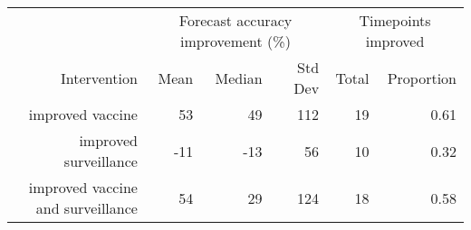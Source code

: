 
\begin{tabular*}{1.0\textwidth}{rrrrrr}
\toprule
             & \multicolumn{3}{c}{Forecast accuracy improvement (\%)} & \multicolumn{2}{c}{Timepoints improved} \\
Intervention & Mean & Median & Std Dev & Total & Proportion \\
\midrule

improved vaccine & 53 & 49 & 112 & 19 & 0.61 \\
improved surveillance & -11 & -13 & 56 & 10 & 0.32 \\
improved vaccine and surveillance & 54 & 29 & 124 & 18 & 0.58 \\

\bottomrule
\end{tabular*}

